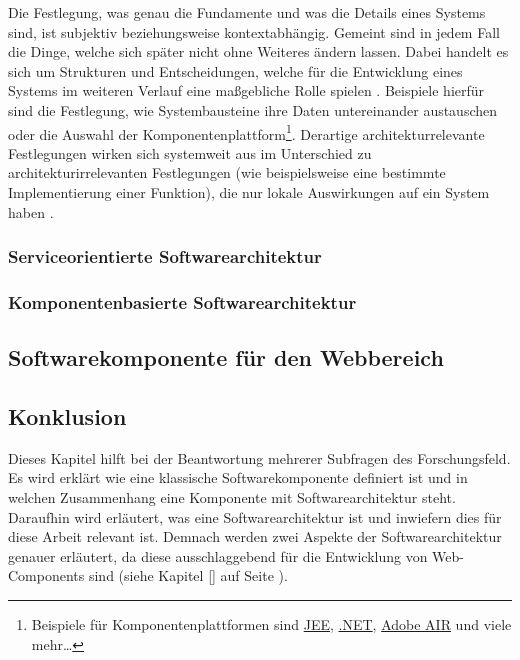 Die Festlegung, was genau die Fundamente und was die Details eines Systems sind, ist subjektiv beziehungsweise kontextabhängig. Gemeint sind in jedem Fall die Dinge, welche sich später nicht ohne Weiteres ändern lassen. Dabei handelt es sich um Strukturen und Entscheidungen, welche für die Entwicklung eines Systems im weiteren Verlauf eine maßgebliche Rolle spielen \citereset \autocite{Fowler.2005}. Beispiele hierfür sind die Festlegung, wie Systembausteine ihre Daten untereinander austauschen oder die Auswahl der Komponentenplattform\footnote{Beispiele für Komponentenplattformen sind \href{http://www.oracle.com/technetwork/java/javaee}{JEE}, \href{http://www.microsoft.com/net}{.NET}, \href{http://www.adobe.com/at/products/air.html}{Adobe AIR} und viele mehr\ldots }. Derartige architekturrelevante Festlegungen wirken sich systemweit aus im Unterschied zu architekturirrelevanten Festlegungen (wie beispielsweise eine bestimmte Implementierung einer Funktion), die nur lokale Auswirkungen auf ein System haben \citereset \autocite{Bredemeyer.Malan.2004}.

\subsubsection{Serviceorientierte Softwarearchitektur}
\label{sec:2_Serviceorientierte_Softwarearchitektur}

\subsubsection{Komponentenbasierte Softwarearchitektur}
\label{sec:2_Komponentenbasierte_Softwarearchitektur}

\subsection{Softwarekomponente für den Webbereich}
\label{sec:2_Softwarekomponente_Web}

\subsection{Konklusion}
\label{sec:2_Konklusion}
Dieses Kapitel hilft bei der Beantwortung mehrerer Subfragen des Forschungsfeld. Es wird erklärt wie eine klassische Softwarekomponente definiert ist und in welchen Zusammenhang eine Komponente mit Softwarearchitektur steht. Daraufhin wird erläutert, was eine Softwarearchitektur ist und inwiefern dies für diese Arbeit relevant ist. Demnach werden zwei Aspekte der Softwarearchitektur genauer erläutert, da diese ausschlaggebend für die Entwicklung von Web-Components sind (siehe Kapitel \ref{} auf Seite \pageref{} ).
